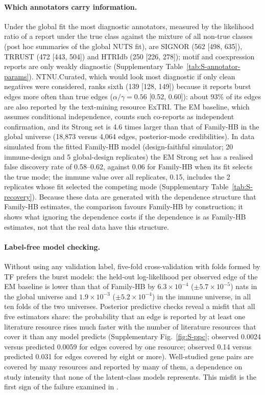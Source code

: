 \documentclass[11pt,a4paper]{article}
\begin{document}
\paragraph{Which annotators carry information.}
Under the global fit the most diagnostic annotators, measured by the likelihood ratio of a report under the true class against the mixture of all non-true classes (post hoc summaries of the global NUTS fit), are SIGNOR (562 [498, 635]), TRRUST (472 [443, 504]) and HTRIdb (250 [226, 278]); motif and coexpression reports are only weakly diagnostic (Supplementary Table~\ref{tab:S-annotator-params}).
NTNU.Curated, which would look most diagnostic if only clean negatives were considered, ranks sixth (139 [128, 149]) because it reports burst edges more often than true edges ($\alpha/\gamma=0.56$ [0.52, 0.60]): about 93\% of its edges are also reported by the text-mining resource ExTRI.
The EM baseline, which assumes conditional independence, counts such co-reports as independent confirmation, and its Strong set is 4.6 times larger than that of Family-HB in the global universe (18{,}873 versus 4{,}064 edges, posterior-mode credibilities).
In data simulated from the fitted Family-HB model (design-faithful simulator; 20 immune-design and 5 global-design replicates) the EM Strong set has a realised false discovery rate of 0.58--0.62, against 0.06 for Family-HB when its fit selects the true mode; the immune value over all replicates, 0.15, includes the 2 replicates whose fit selected the competing mode (Supplementary Table~\ref{tab:S-recovery}).
Because these data are generated with the dependence structure that Family-HB estimates, the comparison favours Family-HB by construction; it shows what ignoring the dependence costs if the dependence is as Family-HB estimates, not that the real data have this structure.

\paragraph{Label-free model checking.}
Without using any validation label, five-fold cross-validation with folds formed by TF prefers the burst models: the held-out log-likelihood per observed edge of the EM baseline is lower than that of Family-HB by \ensuremath{6.3\times10^{-4}} ($\pm$\ensuremath{5.7\times10^{-5}}) nats in the global universe and \ensuremath{1.9\times10^{-3}} ($\pm$\ensuremath{5.2\times10^{-4}}) in the immune universe, in all ten folds of the two universes.
Posterior predictive checks reveal a misfit that all five estimators share: the probability that an edge is reported by at least one literature resource rises much faster with the number of literature resources that cover it than any model predicts (Supplementary Fig.~\ref{fig:S-ppc}; observed 0.0024 versus predicted 0.0059 for edges covered by one resource; observed 0.14 versus predicted 0.031 for edges covered by eight or more).
Well-studied gene pairs are covered by many resources and reported by many of them, a dependence on study intensity that none of the latent-class models represents.
This misfit is the first sign of the failure examined in .
\end{document}
